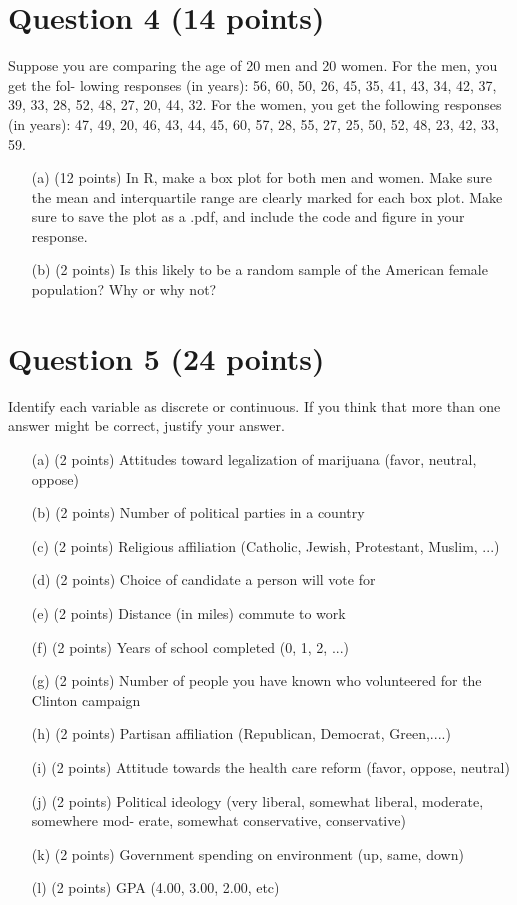 \documentclass[12pt,letterpaper]{article}
\begin{document}
	\section*{Question 4 (14 points)}
	Suppose you are comparing the age of 20 men and 20 women. For the men, you get the fol- lowing responses (in years): 56, 60, 50, 26, 45, 35, 41, 43, 34, 42, 37, 39, 33, 28, 52, 48, 27, 20, 44, 32. For the women, you get the following responses (in years): 47, 49, 20, 46, 43, 44, 45, 60, 57, 28, 55, 27, 25, 50, 52, 48, 23, 42, 33, 59.
	
	\begin{itemize}
		\item[(a)] (12 points) In R, make a box plot for both men and women. Make sure the mean and interquartile range are clearly marked for each box plot. Make sure to save the plot as a .pdf, and include the code and figure in your response.
		\item[(b)] (2 points) Is this likely to be a random sample of the American female population? Why or why not?
	\end{itemize}
	
	\section*{Question 5 (24 points)}
	Identify each variable as discrete or continuous. If you think that more than one answer might be correct, justify your answer.
	
	\begin{itemize}
		\item[(a)] (2 points) Attitudes toward legalization of marijuana (favor, neutral, oppose)
		\item[(b)] (2 points) Number of political parties in a country
		\item[(c)] (2 points) Religious affiliation (Catholic, Jewish, Protestant, Muslim, ...)
		\item[(d)] (2 points) Choice of candidate a person will vote for
		\item[(e)] (2 points) Distance (in miles) commute to work
		\item[(f)] (2 points) Years of school completed (0, 1, 2, ...)
		\item[(g)] (2 points) Number of people you have known who volunteered for the Clinton campaign
		\item[(h)] (2 points) Partisan affiliation (Republican, Democrat, Green,....)
		\item[(i)] (2 points) Attitude towards the health care reform (favor, oppose, neutral)
		\item[(j)] (2 points) Political ideology (very liberal, somewhat liberal, moderate, somewhere mod- erate, somewhat conservative, conservative)
		\item[(k)] (2 points) Government spending on environment (up, same, down)
		\item[(l)] (2 points) GPA (4.00, 3.00, 2.00, etc)
	\end{itemize}
	
\end{document}
